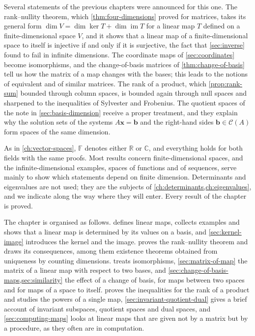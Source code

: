 Several statements of the previous chapters were announced for this one. The rank--nullity theorem, which \cref{thm:four-dimensions} proved for matrices, takes its general form $\dim V=\dim\ker T+\dim\operatorname{im}T$ for a linear map $T$ defined on a finite-dimensional space $V$, and it shows that a linear map of a finite-dimensional space to itself is injective if and only if it is surjective, the fact that \cref{sec:inverse} found to fail in infinite dimensions. The coordinate maps of \cref{sec:coordinates} become isomorphisms, and the change-of-basis matrices of \cref{thm:change-of-basis} tell us how the matrix of a map changes with the bases; this leads to the notions of equivalent and of similar matrices. The rank of a product, which \cref{prop:rank-sum} bounded through column spaces, is bounded again through null spaces and sharpened to the inequalities of Sylvester and Frobenius. The quotient spaces of the note in \cref{sec:basis-dimension} receive a proper treatment, and they explain why the solution sets of the systems $A\mathbf x=\mathbf b$ and the right-hand sides $\mathbf b\in\mathcal C(A)$ form spaces of the same dimension.

As in \cref{ch:vector-spaces}, $\mathbb F$ denotes either $\mathbb R$ or $\mathbb C$, and everything holds for both fields with the same proofs. Most results concern finite-dimensional spaces, and the infinite-dimensional examples, spaces of functions and of sequences, serve mainly to show which statements depend on finite dimension. Determinants and eigenvalues are not used; they are the subjects of \cref{ch:determinants,ch:eigenvalues}, and we indicate along the way where they will enter. Every result of the chapter is proved.

The chapter is organised as follows.  defines linear maps, collects examples and shows that a linear map is determined by its values on a basis, and \cref{sec:kernel-image} introduces the kernel and the image.  proves the rank--nullity theorem and draws its consequences, among them existence theorems obtained from uniqueness by counting dimensions.  treats isomorphisms, \cref{sec:matrix-of-map} the matrix of a linear map with respect to two bases, and \cref{sec:change-of-basis-maps,sec:similarity} the effect of a change of basis, for maps between two spaces and for maps of a space to itself.  proves the inequalities for the rank of a product and studies the powers of a single map, \cref{sec:invariant-quotient-dual} gives a brief account of invariant subspaces, quotient spaces and dual spaces, and \cref{sec:computing-maps} looks at linear maps that are given not by a matrix but by a procedure, as they often are in computation.

